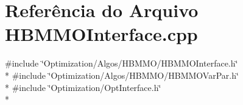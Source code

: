 \section{Referência do Arquivo H\+B\+M\+M\+O\+Interface.\+cpp}
\label{_h_b_m_m_o_interface_8cpp}
{\ttfamily \#include \char`\"{}Optimization/\+Algos/\+H\+B\+M\+M\+O/\+H\+B\+M\+M\+O\+Interface.\+h\char`\"{}}\\*
{\ttfamily \#include \char`\"{}Optimization/\+Algos/\+H\+B\+M\+M\+O/\+H\+B\+M\+M\+O\+Var\+Par.\+h\char`\"{}}\\*
{\ttfamily \#include \char`\"{}Optimization/\+Opt\+Interface.\+h\char`\"{}}\\*
